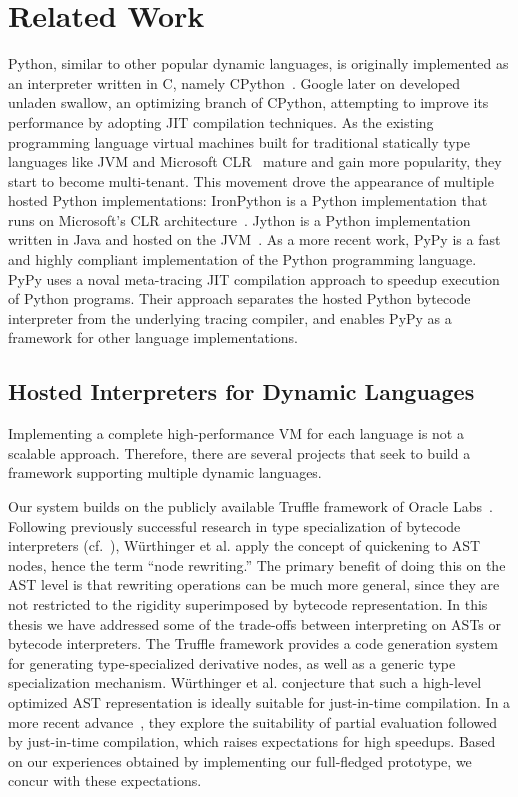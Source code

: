 \chapter{Related Work}
\label{chp:ch6-related-work}

Python, similar to other popular dynamic languages, is originally implemented as an interpreter written in C, namely CPython~\cite{python}.
Google later on developed unladen swallow, an optimizing branch of CPython, attempting to improve its performance by adopting JIT compilation techniques.
As the existing programming language virtual machines built for traditional statically type languages like JVM and Microsoft CLR~\cite{Kennedy+2001,Gough+2001,kilgore2002open} mature and gain more popularity, they start to become multi-tenant.
This movement drove the appearance of multiple hosted Python implementations:
IronPython is a Python implementation that runs on Microsoft's CLR architecture~\cite{hugunin2004ironpython}.
Jython is a Python implementation written in Java and hosted on the JVM~\cite{jython}.
As a more recent work, PyPy\cite{Rigo2006,bolz.etal09,bolz.etal+15} is a fast and highly compliant implementation of the Python programming language.
PyPy uses a noval meta-tracing JIT compilation approach to speedup execution of Python programs.
Their approach separates the hosted Python bytecode interpreter from the underlying tracing compiler, and enables PyPy as a framework for other language implementations.

\section{Hosted Interpreters for Dynamic Languages}

Implementing a complete high-performance VM for each language is not a scalable approach.
Therefore, there are several projects that seek to build a framework supporting multiple dynamic languages.

Our system builds on the publicly available Truffle framework of Oracle Labs~\cite{Wurthinger+12}.
Following previously successful research in type specialization of bytecode interpreters (cf.~\cite{Brunthaler2010inca,Brunthaler2010quickening,williams.etal+10}), W\"{u}rthinger et al. apply the concept of quickening to AST nodes, hence the term ``node rewriting.''
The primary benefit of doing this on the AST level is that rewriting operations can be much more general, since they are not restricted to the rigidity superimposed by bytecode representation.
In this thesis we have addressed some of the trade-offs between interpreting on ASTs or bytecode interpreters.
The Truffle framework provides a code generation system for generating type-specialized derivative nodes, as well as a generic type specialization mechanism.
W\"{u}rthinger et al. conjecture that such a high-level optimized AST representation is ideally suitable for just-in-time compilation.
In a more recent advance~\cite{Wurthinger+13}, they explore the suitability of partial evaluation followed by just-in-time compilation, which raises expectations for high speedups.
Based on our experiences obtained by implementing our full-fledged prototype, we concur with these expectations.

